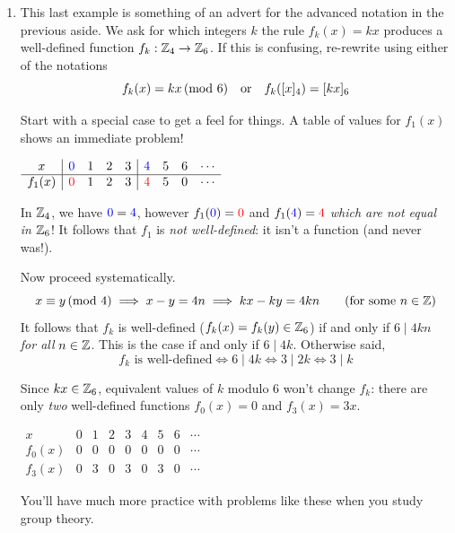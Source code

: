 \begin{examples}{}{}
\begin{enumerate}
	
		\item This last example is something of an advert for the advanced notation in the previous aside. We ask for which integers $k$ the rule $f_k(x)=kx$ produces a well-defined function $f_k:\mathbb{Z}_4\to\mathbb{Z}_6$. If this is confusing, re-rewrite using either of the notations
		\[
			f_k(x)=kx\negthickspace\pmod{6} 
			\quad\text{or}\quad 
			f_k([x]_4)=[kx]_6
		\]		
		\begin{minipage}[t]{0.59\linewidth}\vspace{-10pt}
		 	Start with a special case to get a feel for things. A table of values for $f_1(x)$ shows an immediate problem! 
		\end{minipage}
		\hfill
		\begin{minipage}[t]{0.4\linewidth}\vspace{-12pt}
		  \hfill $\begin{array}{c|cccc|cccc}
				x&\textcolor{blue}{0}&1&2&3&\textcolor{blue}{4}&5&6&\cdots\\\hline
				f_1(x)&\textcolor{red}{0}&1&2&3&\textcolor{red}{4}&5&0&\cdots
			\end{array}$
		\end{minipage}\par
		In $\mathbb{Z}_4$, we have $\textcolor{blue}{0}=\textcolor{blue}{4}$, however $f_1(\textcolor{blue}{0})=\textcolor{red}{0}$ and $f_1(\textcolor{blue}{4})=\textcolor{red}{4}$ \emph{which are not equal in $\mathbb{Z}_6$}! It follows that $f_1$ is \emph{not well-defined}: it isn't a function (and never was!).\par
		Now proceed systematically.
		\[
			x\equiv y\spmod 4\implies x-y=4n 
			\implies kx-ky=4kn \tag{for some $n\in\Z$}
		\]
		It follows that $f_k$ is well-defined ($f_k(x)=f_k(y)\in\mathbb{Z}_6$) if and only if $6\mid 4kn$\, \emph{for all} $n\in\mathbb{Z}$. This is the case if and only if $6\mid 4k$. Otherwise said,
		\[
			\text{$f_k$ is well-defined}\iff 6\mid 4k\iff 3\mid 2k\iff 3\mid k
		\]
		\begin{minipage}[t]{0.59\linewidth}\vspace{-10pt}
			Since $kx\in\mathbb{Z}_6$, equivalent values of $k$ modulo 6 won't change $f_k$: there are only \emph{two} well-defined functions $f_0(x)=0$ and $f_3(x)=3x$.
		\end{minipage}
		\hfill
		\begin{minipage}[t]{0.4\linewidth}\vspace{-12pt}
		  \hfill $\begin{array}{c|cccc|cccc}
				x&0&1&2&3&4&5&6&\cdots\\\hline
				f_0(x)&0&0&0&0&0&0&0&\cdots\\\hline
				f_3(x)&0&3&0&3&0&3&0&\cdots
			\end{array}$
		\end{minipage}\smallbreak
		You'll have much more practice with problems like these when you study group theory.
	\end{enumerate}
\end{examples}



